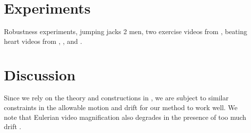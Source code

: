\documentclass{article}
\begin{document}
\section{Experiments}

Robustness experiments, jumping jacks 2 men, two exercise videos from \cite{levy2015live}, beating heart videos from \cite{traliehigh}, \cite{wu2012eulerian}, and \cite{wadhwa2013phase}.


\section{Discussion}

Since we rely on the theory and constructions in \cite{tralie2017quasi}, we are subject to similar constraints in the allowable motion and drift for our method to work well.  We note that Eulerian video magnification also degrades in the presence of too much drift \cite{wu2012eulerian, wadhwa2013phase}.




\end{document}
